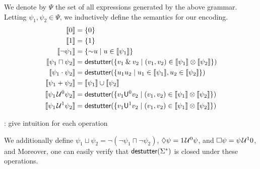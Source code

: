 We denote by $\Psi$ the set of all expressions generated by the above grammar.
Letting $\psi_1, \psi_2 \in \Psi$, we inductively define the semantics for our encoding.
\begin{align*}
		\llbracket 0 \rrbracket &=  \{ 0 \} \\
		\llbracket 1 \rrbracket &=  \{ 1 \} \\
		\llbracket \lnot \psi_1 \rrbracket &= \{ \BitNeg u \st u \in \llbracket \psi_1 \rrbracket \} \\
		\llbracket \psi_1 \sqcap \psi_2 \rrbracket &= \destutter(\{ v_1 \BitAnd v_2 \st (v_1,v_2) \in \llbracket \psi_1 \rrbracket \otimes \llbracket \psi_2 \rrbracket \}) \\
		\llbracket \psi_1 \cdot \psi_2 \rrbracket &= \destutter(\{ u_1 u_2 \st u_1 \in \llbracket \psi_1 \rrbracket, u_2 \in \llbracket \psi_2 \rrbracket \}) \\
		\llbracket \psi_1 + \psi_2 \rrbracket &= \llbracket \psi_1 \rrbracket \cup \llbracket \psi_2 \rrbracket \\
		\llbracket \psi_1 \until^0 \psi_2 \rrbracket &= \destutter(\{ v_1 \mathsf{U}^0 v_2  \st (v_1,v_2) \in \llbracket \psi_1 \rrbracket \otimes \llbracket \psi_2 \rrbracket \}) \\
		\llbracket \psi_1 \until^1 \psi_2 \rrbracket &= \destutter(\{ v_1 \mathsf{U}^1 v_2  \st (v_1,v_2) \in \llbracket \psi_1 \rrbracket \otimes \llbracket \psi_2 \rrbracket \}) \\
\end{align*}

\TODO: give intuition for each operation

We additionally define $\psi_1 \sqcup \psi_2 = \lnot (\lnot \psi_1 \sqcap \lnot \psi_2)$, $\lozenge \psi = 1 \kern.1em\mathcal{U}^0 \psi$, and $\square \psi = \psi \kern.1em\mathcal{U}^1 0$, and 
Moreover, one can easily verify that $\mathsf{destutter}(\Sigma^*)$ is closed under these operations.








